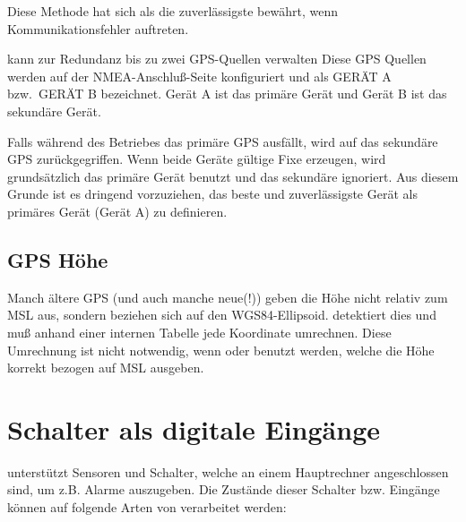 Diese Methode hat sich als die zuverlässigste bewährt, wenn Kommunikationsfehler auftreten.

\xc kann zur Redundanz bis zu zwei GPS-Quellen verwalten
Diese GPS Quellen werden auf der NMEA-Anschluß-Seite konfiguriert und als GERÄT A bzw.\ GERÄT B 
bezeichnet.  Gerät  A ist das primäre Gerät und Gerät B ist das sekundäre Gerät.


Falls während des Betriebes das primäre GPS ausfällt, wird auf das sekundäre GPS zurückgegriffen. Wenn beide Geräte gültige Fixe erzeugen, wird grundsätzlich das primäre Gerät benutzt und das sekundäre ignoriert.  Aus diesem Grunde ist es dringend vorzuziehen, das beste und zuverlässigste Gerät als primäres Gerät (Gerät A) zu definieren.

\subsection*{GPS Höhe}

Manch ältere GPS  (und auch manche neue(!)) geben die Höhe nicht relativ zum MSL aus, sondern beziehen sich auf den WGS84-Ellipsoid.  \xc detektiert dies und muß anhand einer internen Tabelle jede Koordinate umrechnen. Diese Umrechnung ist nicht notwendig, wenn \fl oder \al benutzt werden, welche die Höhe korrekt bezogen auf MSL ausgeben.
\section{Schalter als digitale Eingänge}

\xc unterstützt Sensoren und Schalter, welche an einem Hauptrechner angeschlossen sind, um z.B. Alarme auszugeben. Die Zustände dieser Schalter bzw. Eingänge können auf folgende Arten von \xc verarbeitet werden:

